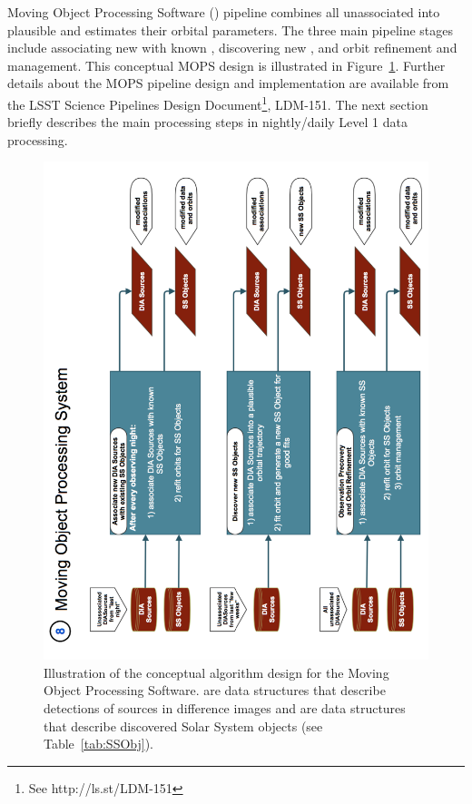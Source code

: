 Moving Object Processing Software () pipeline  combines all unassociated \DIASources into
plausible \SSObjects and estimates their orbital parameters. The three main pipeline stages
include associating new \DIASources with known \SSObjects, discovering new \SSObjects,
and orbit refinement and management. This conceptual MOPS design is illustrated in
Figure~\ref{fig:Pipe8}. Further details about the MOPS pipeline design and implementation are available
from the LSST Science Pipelines Design Document\footnote{See http://ls.st/LDM-151}, LDM-151.
The next section briefly describes the main processing steps in nightly/daily Level 1 data processing.

\begin{figure}[!t]
    \centering
    \includegraphics[scale=0.60, angle=270]{MOPS-Level0}
    \vskip -0.1in
    \caption{Illustration of the conceptual algorithm design for the Moving Object Processing Software.
   \DIASources are data structures that describe detections of sources in difference images and
   \SSObjects are data structures that describe discovered Solar System objects (see Table~\ref{tab:SSObj}).
\label{fig:Pipe8}}
\end{figure}


